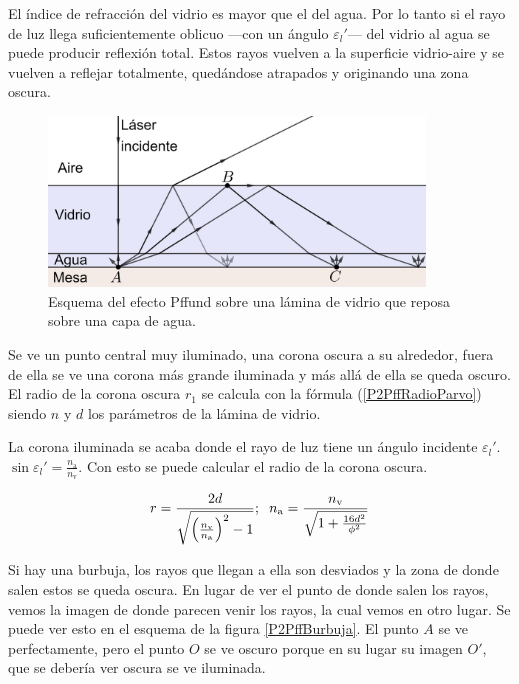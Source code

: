 \documentclass[12pt]{article}
\numberwithin{table}{section}
\numberwithin{figure}{section}
\numberwithin{equation}{section}
\DeclareMathOperator{\sen}{sin}
\begin{document}
El índice de refracción del vidrio es mayor que el del agua. Por lo tanto si el rayo de luz llega suficientemente oblicuo ---con un ángulo $\varepsilon_l'$--- del vidrio al agua se puede producir reflexión total. Estos rayos vuelven a la superficie vidrio-aire y se vuelven a reflejar totalmente, quedándose atrapados y originando una zona oscura.

\begin{figure}[!ht]
	\small \centering \sffamily
	\begin{center}
		\includegraphics[width=10cm]{P2PffAgrio.png}
		\caption{Esquema del efecto Pffund sobre una lámina de vidrio que reposa sobre una capa de agua.}
		\label{P2PffAgrio}
	\end{center}
\end{figure}

Se ve un punto central muy iluminado, una corona oscura a su alrededor, fuera de ella se ve una corona más grande iluminada y más allá de ella se queda oscuro. El radio de la corona oscura $r_1$ se calcula con la fórmula (\ref{P2PffRadioParvo}) siendo $n$ y $d$ los parámetros de la lámina de vidrio.

La corona iluminada se acaba donde el rayo de luz tiene un ángulo incidente $\varepsilon_l'$. $\sen\varepsilon_l'=\frac{n_\text{a}}{n_\text{v}}$. Con esto se puede calcular el radio de la corona oscura.

\begin{equation}\label{P2PffRadioMagno}
	r=\frac{2d}{\sqrt{\left(\frac{n_\text{v}}{n_\text{a}}\right)^2-1}};\hspace{2mm}n_\text{a}=\frac{n_\text{v}}{\sqrt{1+\frac{16d^2}{\phi^2}}}
\end{equation}

Si hay una burbuja, los rayos que llegan a ella son desviados y la zona de donde salen estos se queda oscura. En lugar de ver el punto de donde salen los rayos, vemos la imagen de donde parecen venir los rayos, la cual vemos en otro lugar. Se puede ver esto en el esquema de la figura \ref{P2PffBurbuja}. El punto $A$ se ve perfectamente, pero el punto $O$ se ve oscuro porque en su lugar su imagen $O'$, que se debería ver oscura se ve iluminada.
\end{document}
